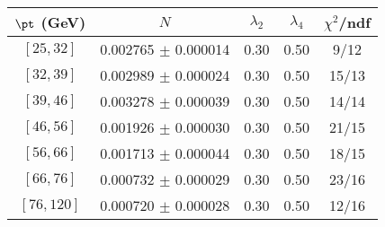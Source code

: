 \begin{tabular}{c||c|c|c|c}
$\pt$ (GeV) & $N$ & $\lambda_{2}$ & $\lambda_4$  & $\chi^2$/ndf  \\
\hline
$[25, 32]$ & 0.002765 $\pm$ 0.000014 & 0.30 & 0.50 & 9/12\\
$[32, 39]$ & 0.002989 $\pm$ 0.000024 & 0.30 & 0.50 & 15/13\\
$[39, 46]$ & 0.003278 $\pm$ 0.000039 & 0.30 & 0.50 & 14/14\\
$[46, 56]$ & 0.001926 $\pm$ 0.000030 & 0.30 & 0.50 & 21/15\\
$[56, 66]$ & 0.001713 $\pm$ 0.000044 & 0.30 & 0.50 & 18/15\\
$[66, 76]$ & 0.000732 $\pm$ 0.000029 & 0.30 & 0.50 & 23/16\\
$[76, 120]$ & 0.000720 $\pm$ 0.000028 & 0.30 & 0.50 & 12/16\\
\end{tabular}
